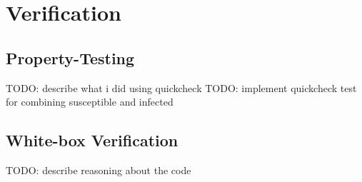 \section{Verification}

\subsection{Property-Testing}
TODO: describe what i did using quickcheck 
TODO: implement quickcheck test for combining susceptible and infected

\subsection{White-box Verification}
TODO: describe reasoning about the code